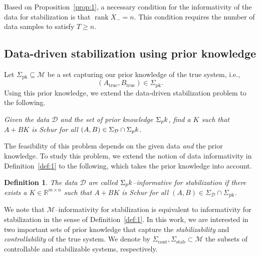 \documentclass[10pt,a4paper]{amsart}
\DeclareMathOperator{\rank}{rank}
\newcommand{\set}[2]{\left\{#1 \mid #2\right\}}
\newtheorem{definition}[theorem]{Definition}
\begin{document}
Based on Proposition~\ref{prop:1}, a necessary condition for the informativity of the data for stabilization is that $\rank X_-=n$. This condition requires the number of data samples to satisfy $T\geq n$.

\subsection{Data-driven stabilization using prior knowledge}

Let $\Sigma_\text{pk}\subseteq\mathcal{M}$ be a set capturing our prior knowledge of the true system, i.e.,
\begin{equation}
(A_\text{true},B_\text{true})\in\Sigma_\text{pk}.
\end{equation}
Using this prior knowledge, we extend the data-driven stabilization problem to the following.

\begin{center}
\textit{Given the data $\mathcal{D}$ and the set of prior knowledge $\Sigma_\textup{pk}$, find a $K$ such that $A+BK$ is Schur for all $(A,B)\in\Sigma_\mathcal{D}\cap\Sigma_\textup{pk}$.}
\end{center}

The feasibility of this problem depends on the given data \emph{and} the prior knowledge. To study this problem, we extend the notion of data informativity in Definition~\ref{def:1} to the following, which takes the prior knowledge into account. 

\begin{definition}
\label{def:2}
The data $\mathcal{D}$ are called $\Sigma_\textup{pk}$--\emph{informative for stabilization} if there exists a $K\in\mathbb{R}^{m\times n}$ such that $A+BK$ is Schur for all $(A,B)\in\Sigma_\mathcal{D}\cap\Sigma_\text{pk}$. 
\end{definition}

We note that $\mathcal{M}$--informativity for stabilization is equivalent to informativity for stabilization in the sense of Definition~\ref{def:1}.  In this work, we are interested in two important sets of prior knowledge that capture the \emph{stabilizability} and \emph{controllability} of the true system. We denote by $\Sigma_\text{cont}, \Sigma_\text{stab} \subset \mathcal{M}$ the subsets of controllable and stabilizable systems, respectively.
\end{document}
